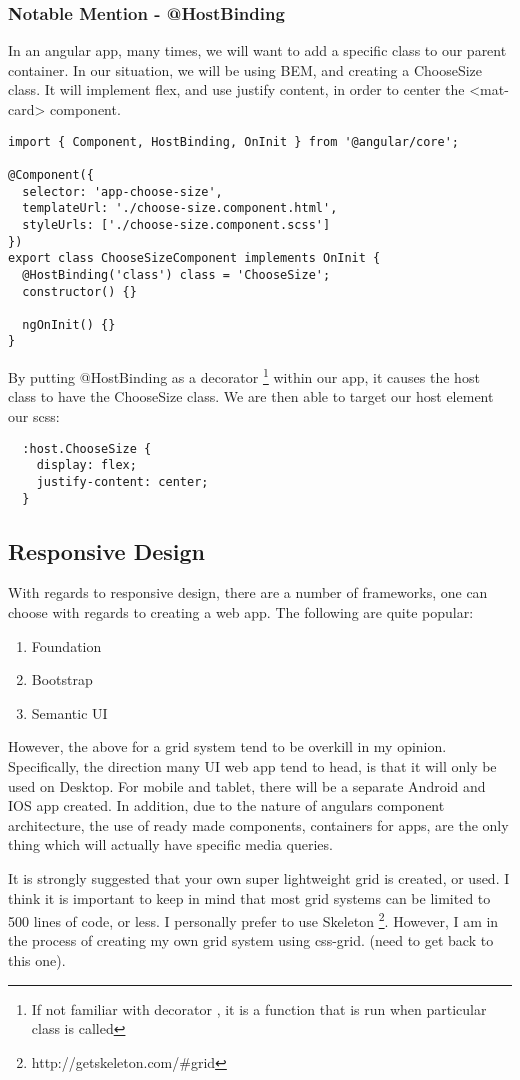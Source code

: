 \subsubsection{ Notable Mention - @HostBinding }
In an angular app, many times, we will want to add a specific class to our
parent container. In our situation, we will be using BEM, and creating a
ChooseSize class. It will implement flex, and use justify content, in order to
center the <mat-card> component.

\begin{lstlisting}[caption=My Javascript Example]
import { Component, HostBinding, OnInit } from '@angular/core';

@Component({
  selector: 'app-choose-size',
  templateUrl: './choose-size.component.html',
  styleUrls: ['./choose-size.component.scss']
})
export class ChooseSizeComponent implements OnInit {
  @HostBinding('class') class = 'ChooseSize';
  constructor() {}

  ngOnInit() {}
}
\end{lstlisting}

By putting @HostBinding as a decorator \footnote{If not familiar with decorator
, it is a function that is run when particular class is called} within our app,
it causes the host class to have the ChooseSize class. We are then able to
target our host element our scss:
\begin{verbatim}
  :host.ChooseSize {
    display: flex;
    justify-content: center;
  }
\end{verbatim}

\subsection{ Responsive Design }
With regards to responsive design, there are a number of frameworks, one can
choose with regards to creating a web app. The following are quite popular:
\begin{enumerate}
  \item Foundation
  \item Bootstrap
  \item Semantic UI
\end{enumerate}

However, the above for a grid system tend to be overkill in my opinion.
Specifically, the direction many UI web app tend to head, is that it will only
be used on Desktop. For mobile and tablet, there will be a separate Android and
IOS app created. In addition, due to the nature of angulars component
architecture, the use of ready made components, containers for apps, are the
only thing which will actually have specific media queries.

It is strongly suggested that your own super lightweight grid is created, or
used. I think it is important to keep in mind that most grid systems can be
limited to 500 lines of code, or less. I personally prefer to use Skeleton
\footnote{http://getskeleton.com/\#grid}. However, I am in the process of
creating my own grid system using css-grid. (need to get back to this one).
